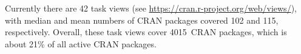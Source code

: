 Currently there are 42 task views (see
\url{https://cran.r-project.org/web/views/}), with median and mean
numbers of CRAN packages covered 102 and 115, respectively.  Overall,
these task views cover 4015~CRAN packages, which is about 21\% of all
active CRAN packages.

\address{Kurt Hornik \\
  WU Wirtschaftsuniversit\"at Wien, Austria \\
  }

\address{Uwe Ligges \\
  TU Dortmund, Germany \\
  }

\address{Achim Zeileis \\
  Universit\"at Innsbruck, Austria \\
  }

